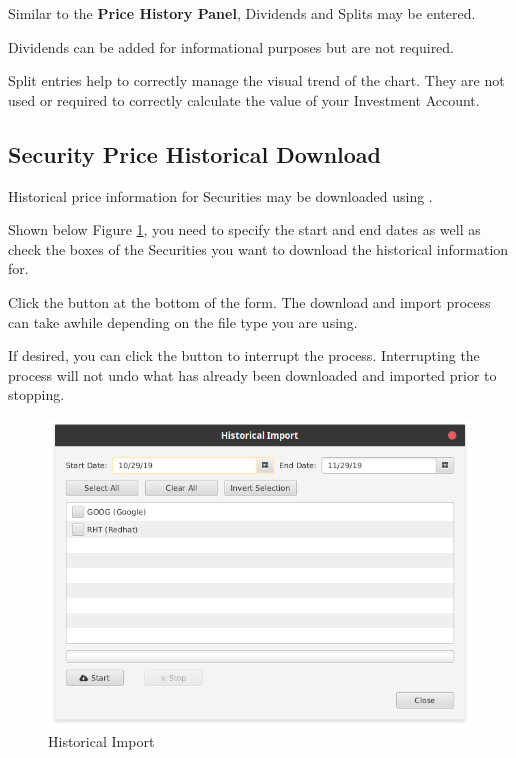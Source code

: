 \documentclass[letterpaper,12pt]{book}
\begin{document}
    Similar to the \textbf{Price History Panel}, Dividends and Splits may be entered.
    
    Dividends can be added for informational purposes but are not required.
    
    Split entries help to correctly manage the visual trend of the chart.  They are not used or required
    to correctly calculate the value of your Investment Account.
    
    
        
           
    \subsection{Security Price Historical Download}
    
    Historical price information for Securities may be downloaded using .
    
    Shown below Figure \ref{fig:historicalImport}, you need to specify the start and end dates as well as check the boxes of the Securities you
    want to download the historical information for.
    
    Click the  button at the bottom of the form.  The download and import process can take awhile 
    depending on the file type you are using.  
    
    If desired, you can click the  button to interrupt the process.  Interrupting the process will not
    undo what has already been downloaded and imported prior to stopping.
    
    \begin{figure}[h]
        \caption{Historical Import}
        \label{fig:historicalImport}
        \includegraphics[width=0.6\linewidth]{images/securityHistoryImport}
    \end{figure}
       
\end{document}
